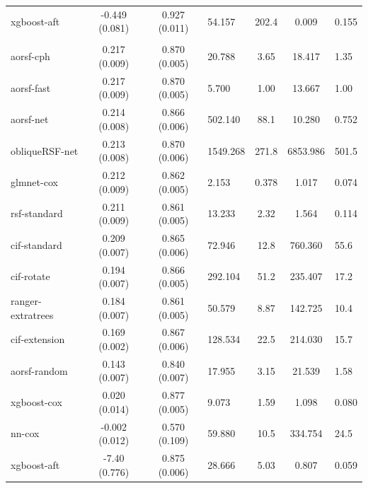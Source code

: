 \documentclass[twoside,11pt]{article}\usepackage[]{graphicx}\usepackage[]{xcolor}
\newenvironment{knitrout}{}{} %
\begin{document}
\begin{knitrout}
\begin{longtable}{lcclccl}
\hspace{1em}xgboost-aft & -0.449 (0.081) & 0.927 (0.011) & 54.157 & 202.4 & 0.009 & 0.155\\
\addlinespace[0.3em]
\hline
\multicolumn{7}{l}{\textit{\textbf{Non-alcohol fatty liver disease; death, n = 17549, p = 24}}}\\
\hline
\hspace{1em}aorsf-cph & 0.217 (0.009) & 0.870 (0.005) & 20.788 & 3.65 & 18.417 & 1.35\\
\hspace{1em}aorsf-fast & 0.217 (0.009) & 0.870 (0.005) & 5.700 & 1.00 & 13.667 & 1.00\\
\hspace{1em}aorsf-net & 0.214 (0.008) & 0.866 (0.006) & 502.140 & 88.1 & 10.280 & 0.752\\
\hspace{1em}obliqueRSF-net & 0.213 (0.008) & 0.870 (0.006) & 1549.268 & 271.8 & 6853.986 & 501.5\\
\hspace{1em}glmnet-cox & 0.212 (0.009) & 0.862 (0.005) & 2.153 & 0.378 & 1.017 & 0.074\\
\hspace{1em}rsf-standard & 0.211 (0.009) & 0.861 (0.005) & 13.233 & 2.32 & 1.564 & 0.114\\
\hspace{1em}cif-standard & 0.209 (0.007) & 0.865 (0.006) & 72.946 & 12.8 & 760.360 & 55.6\\
\hspace{1em}cif-rotate & 0.194 (0.007) & 0.866 (0.005) & 292.104 & 51.2 & 235.407 & 17.2\\
\hspace{1em}ranger-extratrees & 0.184 (0.007) & 0.861 (0.005) & 50.579 & 8.87 & 142.725 & 10.4\\
\hspace{1em}cif-extension & 0.169 (0.002) & 0.867 (0.006) & 128.534 & 22.5 & 214.030 & 15.7\\
\hspace{1em}aorsf-random & 0.143 (0.007) & 0.840 (0.007) & 17.955 & 3.15 & 21.539 & 1.58\\
\hspace{1em}xgboost-cox & 0.020 (0.014) & 0.877 (0.005) & 9.073 & 1.59 & 1.098 & 0.080\\
\hspace{1em}nn-cox & -0.002 (0.012) & 0.570 (0.109) & 59.880 & 10.5 & 334.754 & 24.5\\
\hspace{1em}xgboost-aft & -7.40 (0.776) & 0.875 (0.006) & 28.666 & 5.03 & 0.807 & 0.059\\

\end{longtable}
\end{knitrout}
\end{document}
